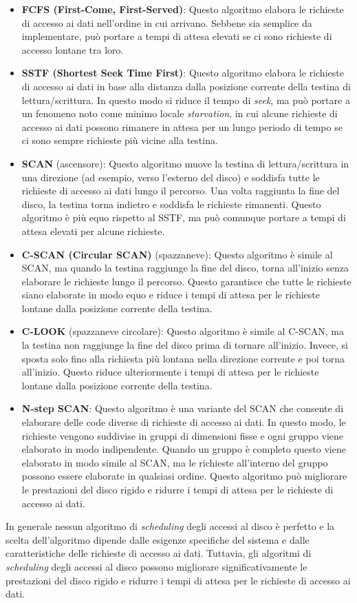    \begin{itemize}
        \item \textbf{FCFS (First-Come, First-Served)}: Questo algoritmo elabora le richieste di accesso ai dati nell'ordine in cui arrivano. Sebbene sia semplice da implementare, può portare a tempi di attesa elevati se ci sono richieste di accesso lontane tra loro.
        \item \textbf{SSTF (Shortest Seek Time First)}: Questo algoritmo elabora le richieste di accesso ai dati in base alla distanza dalla posizione corrente della testina di lettura/scrittura. In questo modo si riduce il tempo di \textit{seek}, ma può portare a un fenomeno noto come minimo locale \textit{starvation}, in cui alcune richieste di accesso ai dati possono rimanere in attesa per un lungo periodo di tempo se ci sono sempre richieste più vicine alla testina.
        \item \textbf{SCAN} (ascensore): Questo algoritmo muove la testina di lettura/scrittura in una direzione (ad esempio, verso l'esterno del disco) e soddisfa tutte le richieste di accesso ai dati lungo il percorso. Una volta raggiunta la fine del disco, la testina torna indietro e soddisfa le richieste rimanenti. Questo algoritmo è più equo rispetto al SSTF, ma può comunque portare a tempi di attesa elevati per alcune richieste.
        \item \textbf{C-SCAN (Circular SCAN)} (spazzaneve): Questo algoritmo è simile al SCAN, ma quando la testina raggiunge la fine del disco, torna all'inizio senza elaborare le richieste lungo il percorso. Questo garantisce che tutte le richieste siano elaborate in modo equo e riduce i tempi di attesa per le richieste lontane dalla posizione corrente della testina.
        \item \textbf{C-LOOK} (spazzaneve circolare): Questo algoritmo è simile al C-SCAN, ma la testina non raggiunge la fine del disco prima di tornare all'inizio. Invece, si sposta solo fino alla richiesta più lontana nella direzione corrente e poi torna all'inizio. Questo riduce ulteriormente i tempi di attesa per le richieste lontane dalla posizione corrente della testina.
        \item \textbf{N-step SCAN}: Questo algoritmo è una variante del SCAN che consente di elaborare delle code diverse di richieste di accesso ai dati. In questo modo, le richieste vengono suddivise in gruppi di dimensioni fisse e ogni gruppo viene elaborato in modo indipendente. Quando un gruppo è completo questo viene elaborato in modo simile al SCAN, ma le richieste all'interno del gruppo possono essere elaborate in qualsiasi ordine. Questo algoritmo può migliorare le prestazioni del disco rigido e ridurre i tempi di attesa per le richieste di accesso ai dati.
    \end{itemize}
    In generale nessun algoritmo di \textit{scheduling} degli accessi al disco è perfetto e la scelta dell'algoritmo dipende dalle esigenze specifiche del sistema e dalle caratteristiche delle richieste di accesso ai dati. Tuttavia, gli algoritmi di \textit{scheduling} degli accessi al disco possono migliorare significativamente le prestazioni del disco rigido e ridurre i tempi di attesa per le richieste di accesso ai dati.

